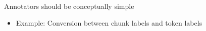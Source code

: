 \documentclass[final]{beamer}
\newcommand{\code}[1]{\texttt{\small #1}}
\begin{document}
\begin{frame}[fragile]
\begin{columns}[t]
\begin{column}{.45\linewidth}
\begin{block}{Annotators should be conceptually simple}
\begin{itemize}
          \begin{itemize}
                  \item Example: Conversion between chunk labels and token labels
          \end{itemize}



\end{itemize}
\end{block}
\end{column}
\end{columns}
\end{frame}
\end{document}
